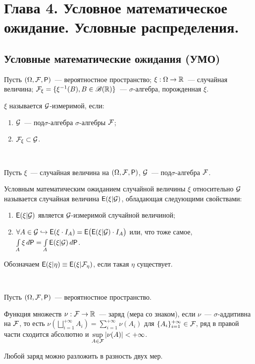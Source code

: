\section{Глава 4. Условное математическое ожидание. Условные распределения.}

\subsection{Условные математические ожидания (УМО)}
Пусть $(\Omega, \mathcal{F}, \mathsf{P})$~--- вероятностное пространство; $\xi: \Omega \rightarrow \mathbb{R}$~--- случайная величина; $\mathcal{F}_\xi = \{ \xi^{-1}(B), B \in \mathscr{B}(\mathbb{R}) \}$~--- $\sigma$-алгебра, порожденная $\xi$. 

\begin{definition}
    $\xi$ называется $\mathcal{G}$-измеримой, если:
    \begin{enumerate}
        \item $\mathcal{G}$~--- под$\sigma$-алгебра $\sigma$-алгебры $\mathcal{F}$;
        \item $\mathcal{F}_\xi \subset \mathcal{G}$.
    \end{enumerate}
\end{definition}

\begin{definition}~

	Пусть $\xi$~--- случайная величина на $(\Omega, \mathcal{F}, \mathsf{P})$, $\mathcal{G}$~--- под$\sigma$-алгебра $\mathcal{F}$. 
	
	Условным математическим ожиданием случайной величины $\xi$ относительно $\mathcal{G}$ называется случайная величина $\mathsf{E} (\xi | \mathcal{G})$, обладающая следующими свойствами:
	\begin{enumerate}
		\item $\mathsf{E}(\xi | \mathcal{G} )$ является $\mathcal{G}$-измеримой случайной величиной;
		\item $\forall A \in \mathcal{G} \hookrightarrow \mathsf{E} ( \xi \cdot I_A) = \mathsf{E} \big( \mathsf{E} (\xi | \mathcal{G} )\cdot I_A \big)$ или, что тоже самое, $\int\limits_A \xi \, d \mathsf{P} = \int\limits_A \mathsf{E} (\xi | \mathcal{G} )\,d \mathsf{P}$.
	\end{enumerate}
	Обозначаем $\mathsf{E} (\xi | \eta ) \equiv \mathsf{E} (\xi | \mathcal{F}_\eta )$, если такая $\eta$ существует.
\end{definition}

\begin{definition}~

	Пусть $(\Omega, \mathcal{F}, \mathsf{P})$~--- вероятностное пространство.
	
	Функция множеств $\nu: \mathcal{F} \rightarrow \mathbb{R}$~--- заряд (мера со знаком), если $\nu$~--- $\sigma$-аддитивна на $\mathcal{F}$, то есть $\nu \left( \bigsqcup\limits_{i=1}^{+\infty} A_i \right) = \sum\limits_{i=1}^{+\infty} \nu (A_i)$ для $\{ A_i \}_{i=1}^{+\infty} \in \mathcal{F}$, ряд в правой части сходится абсолютно и  $\sup\limits_{A \in \mathcal{F}} | \nu(A) | < + \infty$.
	
	Любой заряд можно разложить в разность двух мер.
\end{definition}

